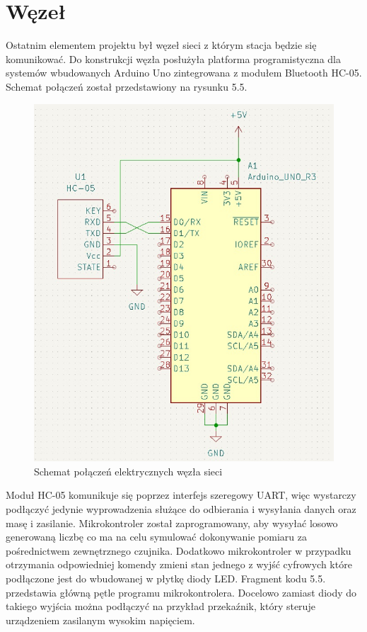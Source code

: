 \documentclass[12pt, twoside, openany]{mwrep}
\begin{document}
\section{Węzeł}
Ostatnim elementem projektu był węzeł sieci z którym stacja będzie się komunikować. Do konstrukcji węzła posłużyła platforma programistyczna dla systemów wbudowanych Arduino Uno zintegrowana z modułem Bluetooth HC-05. Schemat połączeń został przedstawiony na rysunku 5.5.

\begin{figure}[H]
\centering
\includegraphics[width=\textwidth]{schemat}
\caption{Schemat połączeń elektrycznych węzła sieci}
\end{figure}
\par
Moduł HC-05 komunikuje się poprzez interfejs szeregowy UART, więc wystarczy podłączyć jedynie wyprowadzenia służące do odbierania i wysyłania danych oraz masę i zasilanie. Mikrokontroler został zaprogramowany, aby wysyłać losowo generowaną liczbę co ma na celu symulować dokonywanie pomiaru za pośrednictwem zewnętrznego czujnika. Dodatkowo mikrokontroler w przypadku otrzymania odpowiedniej komendy zmieni stan jednego z wyjść cyfrowych które podłączone jest do wbudowanej w płytkę diody LED. Fragment kodu 5.5. przedstawia główną pętle programu mikrokontrolera. Docelowo zamiast diody do takiego wyjścia można podłączyć na przykład przekaźnik, który steruje urządzeniem zasilanym wysokim napięciem.
\end{document}
